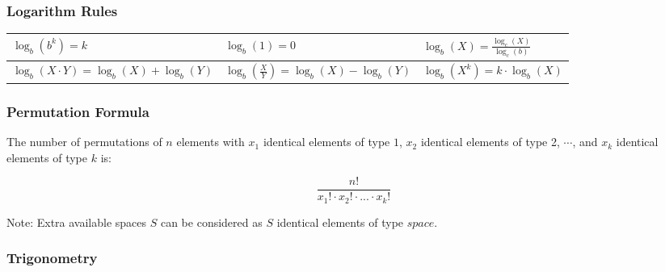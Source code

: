 \documentclass[twoside]{article}
\renewcommand{\arraystretch}{1.5} %
\newcommand{\fileTitleStyle}{\large\underline}
\begin{document}
\subsubsection*{Logarithm Rules}
\vspace{1em}
\sffamily
\bgroup
\def\arraystretch{2}
{\normalsize
\begin{center}
  \begin{tabular}{| >{\centering}m{5cm}| >{\centering}m{5cm}| >{\centering}m{5cm}|}
    \hline
    $\log_b(b^k) = k$
     &
    $\log_b(1) = 0$
     &
    $\log_b(X) = \frac{\log_c(X)}{\log_c(b)}$
    \tabularnewline \hline
    $\log_b(X \cdotp Y) = \log_b(X) + \log_b(Y)$
     &
    $\log_b(\frac{X}{Y}) = \log_b(X) - \log_b(Y)$
     &
    $\log_b(X^k) = k \cdotp \log_b(X)$
    \tabularnewline \hline
  \end{tabular}
\end{center}
}
\egroup
\vspace{1em}
\begin{multicols*}{2}
\end{multicols*}
\subsubsectionfont{\centering\bfseries\Large}
\subsubsectionfont{\fileTitleStyle}
\subsubsection*{Permutation Formula}
\vspace{1em}
\sffamily
\bgroup

The number of permutations of $n$ elements with $x_1$ identical elements of type $1$,
$x_2$ identical elements of type 2, $\cdots$, and $x_k$ identical elements of type $k$ is:

$$\frac{n!}{x_1! \cdot x_2! \cdot ... \cdot x_k!}$$

Note: Extra available spaces $S$ can be considered as $S$ identical elements of type $space$.

\egroup
\vspace{1em}
\begin{multicols*}{2}
\end{multicols*}
\subsubsectionfont{\centering\bfseries\Large}
\vspace{0em}
\subsubsection*{Trigonometry}
\vspace{2em}
\paragraphfont{\centering\bfseries\large}
\paragraphfont{\fileTitleStyle}
\end{document}
